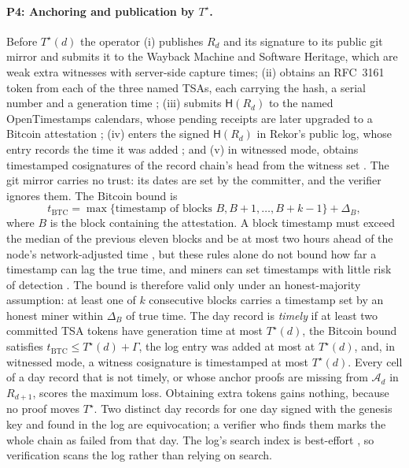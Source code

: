 \documentclass[11pt]{article}
\newcommand{\Hh}{\mathsf{H}}
\newcommand{\Ts}{T^{\star}}
\begin{document}
\paragraph{P4: Anchoring and publication by $\Ts$.} Before $\Ts(d)$ the operator (i) publishes $R_d$ and its signature to its public git mirror and submits it to the Wayback Machine and Software Heritage, which are weak extra witnesses with server-side capture times; (ii) obtains an RFC~3161 token from each of the three named TSAs, each carrying the hash, a serial number and a generation time \citep{rfc3161}; (iii) submits $\Hh(R_d)$ to the named OpenTimestamps calendars, whose pending receipts are later upgraded to a Bitcoin attestation \citep{todd2016ots}; (iv) enters the signed $\Hh(R_d)$ in Rekor's public log, whose entry records the time it was added \citep{rekor_openapi}; and (v) in witnessed mode, obtains timestamped cosignatures of the record chain's head from the witness set \citep{c2sp_witness}. The git mirror carries no trust: its dates are set by the committer, and the verifier ignores them. The Bitcoin bound is
\begin{equation}
  t_{\mathrm{BTC}} = \max\{\text{timestamp of blocks } B, B+1, \dots, B+k-1\} + \Delta_B,
\end{equation}
where $B$ is the block containing the attestation. A block timestamp must exceed the median of the previous eleven blocks and be at most two hours ahead of the node's network-adjusted time \citep{bitcoincore_chain,bip113}, but these rules alone do not bound how far a timestamp can lag the true time, and miners can set timestamps with little risk of detection \citep{szalachowski2018timestamps}. The bound is therefore valid only under an honest-majority assumption: at least one of $k$ consecutive blocks carries a timestamp set by an honest miner within $\Delta_B$ of true time. The day record is \emph{timely} if at least two committed TSA tokens have generation time at most $\Ts(d)$, the Bitcoin bound satisfies $t_{\mathrm{BTC}} \le \Ts(d) + \Gamma$, the log entry was added at most at $\Ts(d)$, and, in witnessed mode, a witness cosignature is timestamped at most $\Ts(d)$. Every cell of a day record that is not timely, or whose anchor proofs are missing from $\mathcal{A}_d$ in $R_{d+1}$, scores the maximum loss. Obtaining extra tokens gains nothing, because no proof moves $\Ts$. Two distinct day records for one day signed with the genesis key and found in the log are equivocation; a verifier who finds them marks the whole chain as failed from that day. The log's search index is best-effort \citep{rekor_openapi}, so verification scans the log rather than relying on search.
\end{document}

